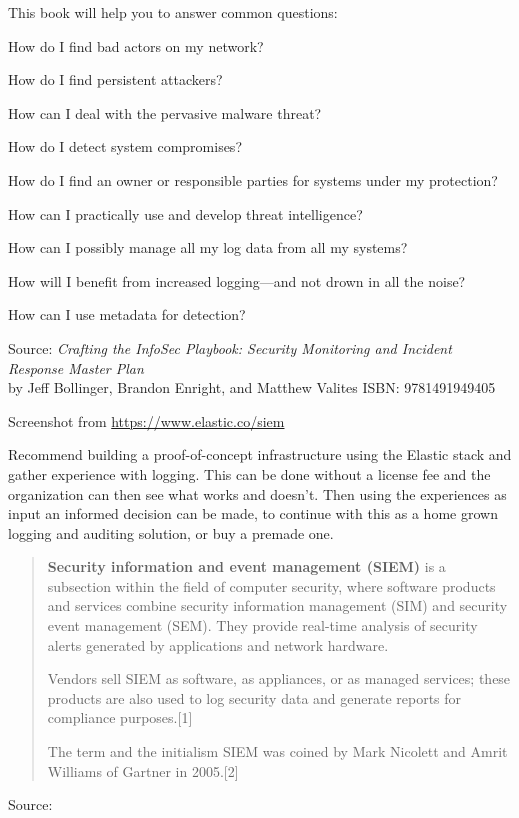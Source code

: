 \documentclass[Screen16to9,17pt]{foils}
\begin{document}
This book will help you to answer common questions:
\begin{list2}
\item How do I find bad actors on my network?
\item How do I find persistent attackers?
\item How can I deal with the pervasive malware threat?
\item How do I detect system compromises?
\item How do I find an owner or responsible parties for systems under my protection?
\item How can I practically use and develop threat intelligence?
\item How can I possibly manage all my log data from all my systems?
\item How will I benefit from increased logging—and not drown in all the noise?
\item How can I use metadata for detection?
\end{list2}
Source: \emph{Crafting the InfoSec Playbook: Security Monitoring and Incident Response Master Plan}\\
 by Jeff Bollinger, Brandon Enright, and Matthew Valites ISBN: 9781491949405




Screenshot from \url{https://www.elastic.co/siem}

Recommend building a proof-of-concept infrastructure using the Elastic stack and gather experience with logging. This can be done without a license fee and the organization can then see what works and doesn't. Then using the experiences as input an informed decision can be made, to continue with this as a home grown logging and auditing solution, or buy a premade one.




\begin{quote}
{\bf Security information and event management (SIEM)} is a subsection within the field of computer security, where software products and services combine security information management (SIM) and security event management (SEM). They provide real-time analysis of security alerts generated by applications and network hardware.

  Vendors sell SIEM as software, as appliances, or as managed services; these products are also used to log security data and generate reports for compliance purposes.[1]

  The term and the initialism SIEM was coined by Mark Nicolett and Amrit Williams of Gartner in 2005.[2]
\end{quote}
Source: 
\end{document}
